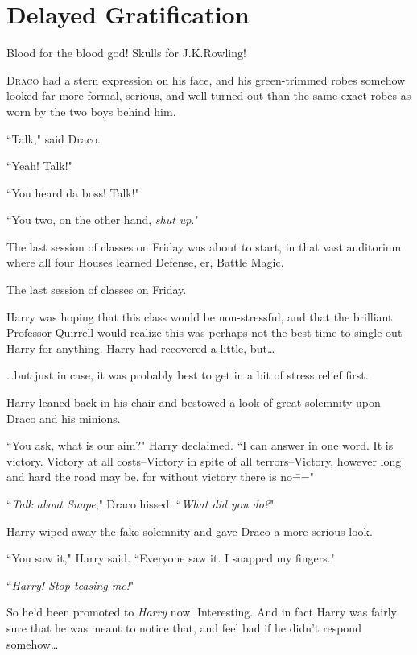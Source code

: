 \chapter{Delayed Gratification}

\begin{chapterOpeningAuthorNote}
Blood for the blood god! Skulls for J.\?K.\?Rowling!
\end{chapterOpeningAuthorNote}

\lettrine{D}{raco} had a stern expression on his face, and his green-trimmed robes somehow looked far more formal, serious, and well-turned-out than the same exact robes as worn by the two boys behind him.

``Talk," said Draco.

``Yeah! Talk!"

``You heard da boss! Talk!"

``You two, on the other hand, \emph{shut up}."

The last session of classes on Friday was about to start, in that vast auditorium where all four Houses learned Defense, er, Battle Magic.

The last session of classes on Friday.

Harry was hoping that this class would be non-stressful, and that the brilliant Professor Quirrell would realize this was perhaps not the best time to single out Harry for anything. Harry had recovered a little, but{\ldots}

{\ldots}but just in case, it was probably best to get in a bit of stress relief first.

Harry leaned back in his chair and bestowed a look of great solemnity upon Draco and his minions.

``You ask, what is our aim?" Harry declaimed. ``I can answer in one word. It is victory. Victory at all costs\---Victory in spite of all terrors\---Victory, however long and hard the road may be, for without victory there is no\==="

``\emph{Talk about Snape}," Draco hissed. ``\emph{What did you do?}"

Harry wiped away the fake solemnity and gave Draco a more serious look.

``You saw it," Harry said. ``Everyone saw it. I snapped my fingers."

``\emph{Harry! Stop teasing me!}"

So he'd been promoted to \emph{Harry} now. Interesting. And in fact Harry was fairly sure that he was meant to notice that, and feel bad if he didn't respond somehow{\ldots}

